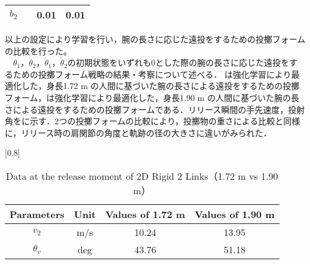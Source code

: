 \begin{small}
\begin{table}[tb]
\begin{center}
{\begin{tabular}{c|c|c|c}
      $b_{2}$ &  & 0.01 & 0.01\\
      \hline
    \end{tabular}
    }
  \end{center}
\end{table}
以上の設定により学習を行い，腕の長さに応じた遠投をするための投擲フォームの比較を行った。\\
　$\theta_{1}$，$\theta_{2}$，$\dot{\theta}_{1}$，$\dot{\theta}_{2}$の初期状態をいずれも0とした際の腕の長さに応じた遠投をするための投擲フォーム戦略の結果・考察について述べる．
は強化学習により最適化した，身長1.72 m の人間に基づいた腕の長さによる遠投をするための投擲フォーム，は強化学習により最適化した，身長1.90 m の人間に基づいた腕の長さによる遠投をするための投擲フォームである．リリース瞬間の手先速度，投射角をに示す．2つの投擲フォームの比較により，投擲物の重さによる比較と同様に，リリース時の肩関節の角度と軌跡の径の大きさに違いがみられた．
\begin{table}[tb]
  \begin{center}
    \caption{Data at the release moment of 2D Rigid 2 Links（1.72 m vs 1.90 m）}
    \scalebox{0.8}[0.8]{
    \begin{tabular}{c|c|c|c}
      \hline
      Parameters & Unit & Values of 1.72 m & Values of 1.90 m \\
      \hline
      $v_{2}$ & m/s & 10.24 & 13.95 \\
      $\theta_{v}$ & deg & 43.76 & 51.18 \\
      \hline
    \end{tabular}
    }
  \end{center}
\end{table}

\end{small}
